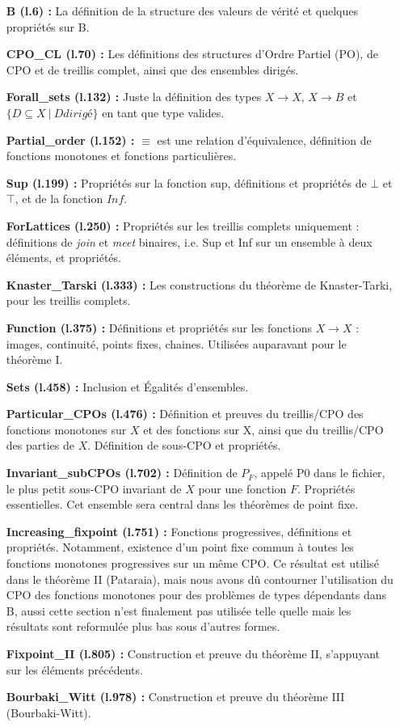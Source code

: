 \documentclass{article}
\newcommand\code[1]{{\fontfamily{lmtt}\selectfont #1}}
\theoremstyle{definition}
\begin{document}
\medskip

\begin{itemize}
\item[\textbf{B (l.6) :}] La définition de la structure des valeurs de vérité et quelques propriétés sur B.
\item[\textbf{CPO\_CL (l.70) :}] Les définitions des structures d'Ordre Partiel (PO), de CPO et de treillis complet, ainsi que des ensembles dirigés.
\item[\textbf{Forall\_sets (l.132) :}] Juste la définition des types $X \rightarrow X$, $X \rightarrow B$ et $\{ D \subseteq X ~ | ~ D dirigé \}$ en tant que type valides.
\item[\textbf{Partial\_order (l.152) :}] $\equiv$ est une relation d'équivalence, définition de fonctions monotones et fonctions particulières.
\item[\textbf{Sup (l.199) :}] Propriétés sur la fonction sup, définitions et propriétés de $\bot$ et $\top$, et de la fonction $Inf$.
\item[\textbf{ForLattices (l.250) :}] Propriétés sur les treillis complets uniquement : définitions de \textit{join} et \textit{meet} binaires, i.e. Sup et Inf sur un ensemble à deux éléments, et propriétés.
\item[\textbf{Knaster\_Tarski (l.333) :}] Les constructions du théorème de Knaster-Tarki, pour les treillis complets.
\item[\textbf{Function (l.375) :}] Définitions et propriétés sur les fonctions $X \rightarrow X$ : images, continuité, points fixes, chaines. Utilisées auparavant pour le théorème I.
\item[\textbf{Sets (l.458) :}] Inclusion et Égalités d'ensembles.
\item[\textbf{Particular\_CPOs (l.476) :}] Définition et preuves du treillis/CPO des fonctions monotones sur $X$ et des fonctions sur X, ainsi que du treillis/CPO des parties de $X$. Définition de sous-CPO et propriétés.
\item[\textbf{Invariant\_subCPOs (l.702) :}] Définition de $P_F$, appelé \code{P0} dans le fichier, le plus petit sous-CPO invariant de $X$ pour une fonction $F$. Propriétés essentielles. Cet ensemble sera central dans les théorèmes de point fixe.
\item[\textbf{Increasing\_fixpoint (l.751) :}] Fonctions progressives, définitions et propriétés. Notamment, existence d'un point fixe commun à toutes les fonctions monotones progressives sur un même CPO. Ce résultat est utilisé dans le théorème II (Pataraia), mais nous avons dû contourner l'utilisation du CPO des fonctions monotones pour des problèmes de types dépendants dans B, aussi cette section n'est finalement pas utilisée telle quelle mais les résultats sont reformulée plus bas sous d'autres formes.
\item[\textbf{Fixpoint\_II (l.805) :}] Construction et preuve du théorème II, s'appuyant sur les éléments précédents.
\item[\textbf{Bourbaki\_Witt (l.978) :}] Construction et preuve du théorème III (Bourbaki-Witt).
\end{itemize}
\end{document}
